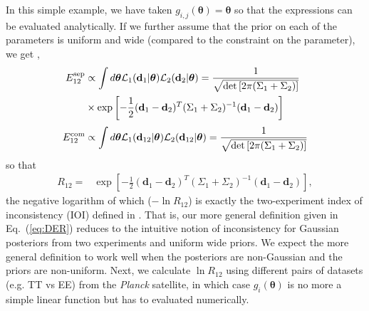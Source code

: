 \documentclass[amsmath, amssymb, reprint, aps]{revtex4-1}
\newcommand{\dv}{\textbf{d}}
\newcommand{\donev}{\textbf{d}_1}
\newcommand{\dtwov}{\textbf{d}_2}
\newcommand{\tv}{\bm{\theta}}
\begin{document}
{        In this simple example, we have taken $g_{i,j}(\tv) = \tv$ so that the expressions can be evaluated analytically. If we further assume that the prior on each of the parameters is uniform and wide (compared to the constraint on the parameter), we get \cite{IMM2012-03274},
        \begin{align}
            \nonumber
            E_{12}^{\rm sep} &\propto \int d\tv \mathcal{L}_1(\dv_1|\tv) \mathcal{L}_2(\dv_2|\tv) 
            = \frac{1}{\sqrt{\det\left[2\pi(\Sigma_1+\Sigma_2)\right]}} \\ & \times\exp \left[-\frac{1}{2}(\donev-\dtwov)^T(\Sigma_1+\Sigma_2)^{-1}(\donev-\dtwov)\right] 
            \\[0.1cm]
            E_{12}^{\rm com} &\propto \int d\tv \mathcal{L}_1(\dv_{12}|\tv) \mathcal{L}_2(\dv_{12}|\tv)  
            = \frac{1}{\sqrt{\det\left[2\pi(\Sigma_1 + \Sigma_2)\right]}}
            \nonumber
        \end{align}
        so that
        \begin{align}
            \!\!\!
            R_{12} =& \exp \left[-\frac{1}{2}(\donev-\dtwov)^T(\Sigma_1+\Sigma_2)^{-1}(\donev-\dtwov)\right], \label{eq:R12NGaus}
        \end{align}
        the {negative} logarithm of which ($-\ln R_{12}$) is exactly the two-experiment index of inconsistency (IOI) defined in \cite{Lin:2017ikq}. That is, our more general definition given in Eq.~(\ref{eq:DER}) reduces to the intuitive notion of inconsistency for Gaussian posteriors from two experiments and uniform wide priors. We expect the more general definition to work well when the posteriors are non-Gaussian and the priors are non-uniform. Next, we calculate $\ln R_{12}$ using different pairs of datasets (e.g. TT vs EE) from the {\it Planck} satellite, in which case $g_i(\tv)$ is no more a simple linear function but has to evaluated numerically.
        
}
\end{document}
